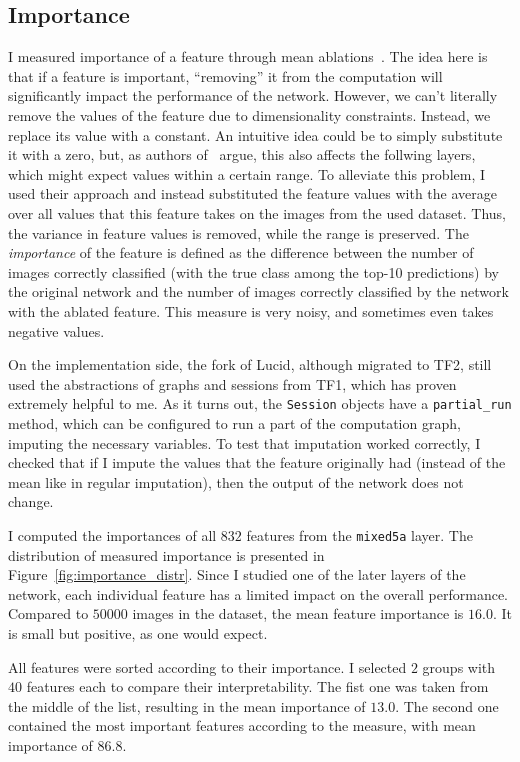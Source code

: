 \documentclass[12pt]{article}
\begin{document}
\subsection{Importance}
I measured importance of a feature through mean ablations~\cite{wang2022interpretability}. The idea here is that if a feature is important, ``removing'' it from the computation will significantly impact the performance of the network. However, we can't literally remove the values of the feature due to dimensionality constraints. Instead, we replace its value with a constant. An intuitive idea could be to simply substitute it with a zero, but, as authors of~\cite{wang2022interpretability} argue, this also affects the follwing layers, which might expect values within a certain range. To alleviate this problem, I used their approach and instead substituted the feature values with the average over all values that this feature takes on the images from the used dataset. Thus, the variance in feature values is removed, while the range is preserved. The \textit{importance} of the feature is defined as the difference between the number of images correctly classified (with the true class among the top-10 predictions) by the original network and the number of images correctly classified by the network with the ablated feature. This measure is very noisy, and sometimes even takes negative values.

On the implementation side, the fork of Lucid, although migrated to TF2, still used the abstractions of graphs and sessions from TF1, which has proven extremely helpful to me. As it turns out, the \texttt{Session} objects have a \texttt{partial\_run} method, which can be configured to run a part of the computation graph, imputing the necessary variables. To test that imputation worked correctly, I checked that if I impute the values that the feature originally had (instead of the mean like in regular imputation), then the output of the network does not change.

I computed the importances of all $832$ features from the \texttt{mixed5a} layer. The distribution of measured importance is presented in Figure~\ref{fig:importance_distr}. Since I studied one of the later layers of the network, each individual feature has a limited impact on the overall performance. Compared to $50000$ images in the dataset, the mean feature importance is $16.0$. It is small but positive, as one would expect.

All features were sorted according to their importance. I selected $2$ groups with $40$ features each to compare their interpretability. The fist one was taken from the middle of the list, resulting in the mean importance of $13.0$. The second one contained the most important features according to the measure, with mean importance of $86.8$.
\end{document}
